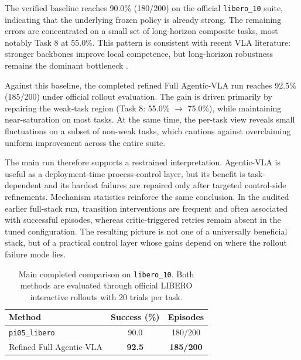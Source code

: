 \documentclass[a4paper]{Template/LaTeX_Templates/waica}
\begin{document}
The verified baseline reaches 90.0\% (180/200) on the official \texttt{libero\_10} suite, indicating that the underlying frozen policy is already strong. The remaining errors are concentrated on a small set of long-horizon composite tasks, most notably Task 8 at 55.0\%. This pattern is consistent with recent VLA literature: stronger backbones improve local competence, but long-horizon robustness remains the dominant bottleneck \cite{longvla,onetwovla,scivla}.

Against this baseline, the completed refined Full Agentic-VLA run reaches 92.5\% (185/200) under official rollout evaluation. The gain is driven primarily by repairing the weak-task region (Task 8: 55.0\% $\rightarrow$ 75.0\%), while maintaining near-saturation on most tasks. At the same time, the per-task view reveals small fluctuations on a subset of non-weak tasks, which cautions against overclaiming uniform improvement across the entire suite.

The main run therefore supports a restrained interpretation. Agentic-VLA is useful as a deployment-time process-control layer, but its benefit is task-dependent and its hardest failures are repaired only after targeted control-side refinements. Mechanism statistics reinforce the same conclusion. In the audited earlier full-stack run, transition interventions are frequent and often associated with successful episodes, whereas critic-triggered retries remain absent in the tuned configuration. The resulting picture is not one of a universally beneficial stack, but of a practical control layer whose gains depend on where the rollout failure mode lies.

\begin{table}[t]
\caption{Main completed comparison on \texttt{libero\_10}. Both methods are evaluated through official LIBERO interactive rollouts with 20 trials per task.}
\label{tab:main_libero10_results}
\centering
\begin{tabular}{lcc}
\toprule
Method & Success (\%) & Episodes \\
\midrule
\texttt{pi05\_libero} & 90.0 & 180/200 \\
Refined Full Agentic-VLA & \textbf{92.5} & \textbf{185/200} \\
\bottomrule
\end{tabular}
\end{table}
\end{document}
